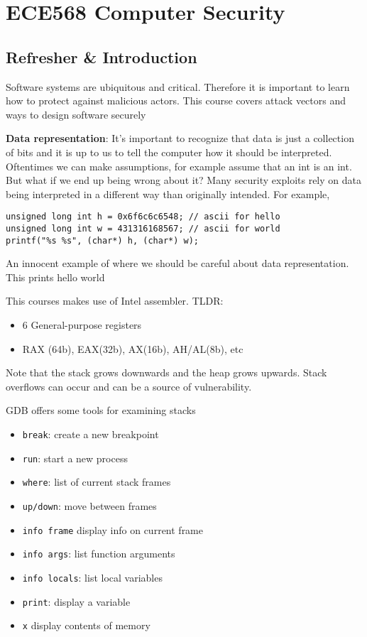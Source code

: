 \documentclass[../notes.tex]{subfiles}
\begin{document}
\section{ECE568 Computer Security}

\subsection{Refresher \& Introduction}

Software systems are ubiquitous and critical. Therefore it is important to learn how to protect against malicious actors. This course covers attack vectors and ways to design software securely



\textbf{Data representation}: It's important to recognize that data is just a collection of bits and it is up to us to tell the computer how it should be interpreted. Oftentimes we can make assumptions, for example assume that an int is an int. But what if we end up being wrong about it? 
Many security exploits rely on data being interpreted in a different way than originally intended.
For example,

\begin{listing}[H]
\begin{verbatim}
unsigned long int h = 0x6f6c6c6548; // ascii for hello
unsigned long int w = 431316168567; // ascii for world
printf("%s %s", (char*) h, (char*) w);
\end{verbatim}
\caption{An innocent example of where we should be careful about data representation. This prints hello world}
\end{listing}

This courses makes use of Intel assembler.
TLDR:

\begin{itemize}
  \item 6 General-purpose registers
  \item RAX (64b), EAX(32b), AX(16b), AH/AL(8b), etc
\end{itemize}

Note that the stack grows downwards and the heap grows upwards. Stack overflows can occur and can be a source of vulnerability.


GDB offers some tools for examining stacks

\begin{itemize}
    \item \texttt{break}: create a new breakpoint
    \item \texttt{run}: start a new process
    \item \texttt{where}: list of current stack frames
    \item \texttt{up/down}: move between frames
    \item \texttt{info frame} display info on current frame
    \item \texttt{info args}: list function arguments
    \item \texttt{info locals}: list local variables
    \item \texttt{print}: display a variable
    \item \texttt{x} display contents of memory
\end{itemize}
\end{document}

